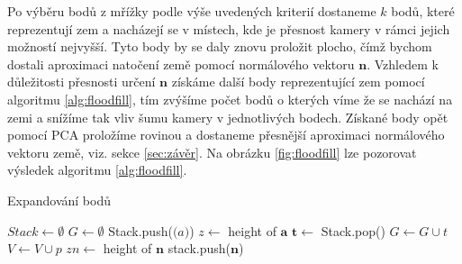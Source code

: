\documentclass[twoside]{ctuthesis}
\newcommand{\tl}[1]{$\mathbf{#1}$}
\begin{document}
Po výběru bodů z mřížky podle výše uvedených kriterií dostaneme $k$ bodů, které reprezentují zem a nacházejí se v místech, kde je přesnost kamery v rámci jejich možností nejvyšší. Tyto body by se daly znovu proložit plocho, čímž bychom dostali aproximaci natočení země pomocí normálového vektoru \tl{n}. Vzhledem k důležitosti přesnosti určení \tl{n} získáme další body reprezentující zem pomocí algoritmu \ref{alg:floodfill}, tím zvýšíme počet bodů o kterých víme že se nachází na zemi a snížíme tak vliv šumu kamery v jednotlivých bodech. Získané body opět pomocí PCA proložíme rovinou a dostaneme přesnější aproximaci normálového vektoru země, viz. sekce \ref{sec:závěr}. Na obrázku \ref{fig:floodfill} lze pozorovat výsledek algoritmu \ref{alg:floodfill}.
    
    
\begin{algorithm}
    \caption{Expandování bodů }
    \label{alg:floodfill}
    \begin{algorithmic}
        \STATE $Stack \gets \emptyset$
        \STATE $G \gets \emptyset$
            \STATE Stack.push($\mathbf(a)$)
            \STATE $z \gets$ height of $\mathbf{a}$
                \STATE $\mathbf{t} \gets$ Stack.pop()
                \STATE $G \gets G \cup t$
                \STATE $V \gets V \cup p$
                    \STATE $zn \gets$ height of $\mathbf{n}$
                    \STATE stack.push($\mathbf{n}$)
                    \ENDIF
                \ENDFOR
            \ENDWHILE
        \ENDFOR
    \end{algorithmic}
\end{algorithm}
\end{document}
